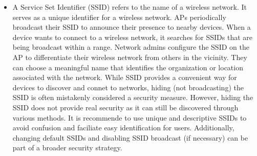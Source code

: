 \documentclass{article}
\begin{document}
\begin{itemize}
	\item[] A Service Set Identifier (SSID) refers to the name of a wireless network. It serves as a unique identifier for a wireless network. APs periodically broadcast their SSID to announce their presence to nearby devices. When a device wants to connect to a wireless network, it searches for SSIDs that are being broadcast within a range. Network admins configure the SSID on the AP to differentiate their wireless network from others in the vicinity. They can choose a meaningful name that identifies the organization or location associated with the network. While SSID provides a convenient way for devices to discover and connet to networks, hiding (not broadcasting) the SSID is often mistakenly considered a security measure. However, hiding the SSID does not provide real security as it can still be discovered through various methods. It is recommende to use unique and descriptive SSIDs to avoid confusion and faciliate easy identification for users. Additionally, changing default SSIDs and disabling SSID broadcast (if necessary) can be part of a broader security strategy.


\end{itemize}
\end{document}
